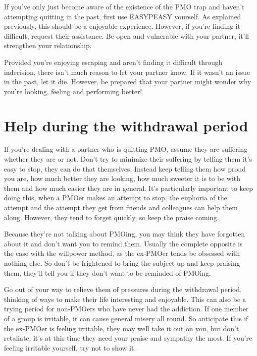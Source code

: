 \documentclass[easypeasy.tex]{subfiles}
\begin{document}
If you've only just become aware of the existence of the PMO trap and haven't attempting quitting in the past, first use EASYPEASY yourself. As explained previously, this should be a enjoyable experience. However, if you're finding it difficult, request their assistance. Be open and vulnerable with your partner, it'll strengthen your relationship. 

Provided you're enjoying escaping and aren't finding it difficult through indecision, there isn't much reason to let your partner know. If it wasn't an issue in the past, let it die. However, be prepared that your partner might wonder why you're looking, feeling and performing better!

\section{Help during the withdrawal period}

If you're dealing with a partner who is quitting PMO, assume they are suffering whether they are or not. Don't try to minimize their suffering by telling them it's easy to stop, they can do that themselves. Instead keep telling them how proud you are, how much better they are looking, how much sweeter it is to be with them and how much easier they are in general. It's particularly important to keep doing this, when a PMOer makes an attempt to stop, the euphoria of the attempt and the attempt they get from friends and colleagues can help them along. However, they tend to forget quickly, so keep the praise coming.

Because they're not talking about PMOing, you may think they have forgotten about it and don't want you to remind them. Usually the complete opposite is the case with the willpower method, as the ex-PMOer tends be obsessed with nothing else. So don't be frightened to bring the subject up and keep praising them, they'll tell you if they don't want to be reminded of PMOing.

Go out of your way to relieve them of pressures during the withdrawal period, thinking of ways to make their life interesting and enjoyable. This can also be a trying period for non-PMOers who have never had the addiction. If one member of a group is irritable, it can cause general misery all round. So anticipate this if the ex-PMOer is feeling irritable, they may well take it out on you, but don't retaliate, it's at this time they need your praise and sympathy the most. If you're feeling irritable yourself, try not to show it.
\end{document}
